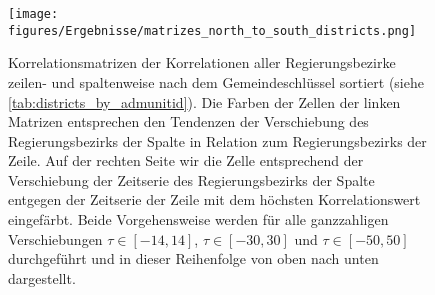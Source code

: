 \begin{figure}[H]
    \centering
    \texttt{[image: figures/Ergebnisse/matrizes\_north\_to\_south\_districts.png]}
    \caption{Korrelationsmatrizen der Korrelationen aller Regierungsbezirke zeilen- und spaltenweise nach dem Gemeindeschlüssel sortiert (siehe \autoref{tab:districts_by_admunitid}). Die Farben der Zellen der linken Matrizen entsprechen den Tendenzen der Verschiebung des Regierungsbezirks der Spalte in Relation zum Regierungsbezirks der Zeile.
    Auf der rechten Seite wir die Zelle entsprechend der Verschiebung der Zeitserie des Regierungsbezirks der Spalte entgegen der Zeitserie der Zeile mit dem höchsten Korrelationswert eingefärbt. Beide Vorgehensweise werden für alle ganzzahligen Verschiebungen $\tau\in[-14,14]$,  $\tau\in[-30,30]$ und  $\tau\in[-50,50]$ durchgeführt und in dieser Reihenfolge von oben nach unten dargestellt.}
    \label{fig:matrizes_north_to_south_districts}
\end{figure}
